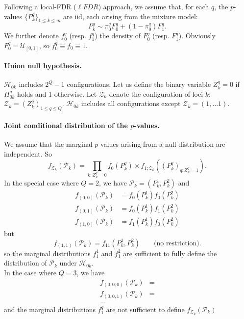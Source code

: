 \documentclass[a4paper, 11pt]{article}
\newcommand{\Hcal}{\mathcal{H}}
\newcommand{\Pcal}{\mathcal{P}}
\newcommand{\Ucal}{\mathcal{U}}
\newcommand{\Zcal}{\mathcal{Z}}
\begin{document}
Following a local-FDR ($\ell FDR$) approach, we assume that, for each $q$, the $p$-values $\{P^q_k\}_{1 \leq k \leq m}$ are iid, each arising from the mixture model:
\begin{equation} \label{eq:MixturePk}
 P^q_k \sim \pi_0^q F^q_0 + (1-\pi_0^q) F^q_1.
\end{equation}
We further denote $f^q_0$ (resp. $f^q_1$) the density of $F^q_0$ (resp. $F^q_1$). Obviously $F^q_0 = \Ucal_{[0, 1]}$, so $f^q_0 \equiv f_0 \equiv 1$.

\paragraph{Union null hypothesis.} 
$\Hcal_{0k}$ includes $2^Q -1$ configurations. Let us define the binary variable
$Z^q_k = 0$ if $H^q_{0k}$ holds and 1 otherwise. Let $\Zcal_k$ denote the configuration of loci $k$: $\Zcal_k = (Z^q_k)_{1 \leq q \leq Q}$. $\Hcal_{0k}$ includes all configurations except $\Zcal_k = (1, \dots 1)$.

\paragraph{Joint conditional distribution of the $p$-values.} We assume that the marginal $p$-values arising from a null distribution are independent. So
$$
f_{\Zcal_k}(\Pcal_k) = \prod_{k: Z^q_k=0} f_0(P^q_k) \times f_{1;\Zcal_k}\left((P^q_k)_{q: Z^q_k=1}\right).
$$
In the special case where $Q=2$, we have $\Pcal_k = (P^1_k, P^2_k)$ and
\begin{align*}
  f_{(0,0)}(\Pcal_k) & = f_0(P^1_k) f_0(P^2_k) \\
  f_{(0,1)}(\Pcal_k) & = f_0(P^1_k) f_1(P^2_k) \\
  f_{(1,0)}(\Pcal_k) & = f_1(P^1_k) f_0(P^2_k) 
\end{align*}
but
$$
f_{(1,1)}(\Pcal_k) = f_{11}(P^1_k, P^2_k)
\qquad \text{(no restriction).}
$$
so the marginal distributions $f^1_1$ and $f^2_1$ are sufficient to fully define the distribution of $\Pcal_k$ under $\Hcal_{0k}$. \\
In the case where $Q=3$, we have
\begin{align*}
  f_{(0,0,0)}(\Pcal_k) & = \\
  f_{(0,0,1)}(\Pcal_k) & = \\
  \dots 
\end{align*}
and the marginal distributions $f^q_1$ are not sufficient to define $f_{\Zcal_k}(\Pcal_k)$
\end{document}
